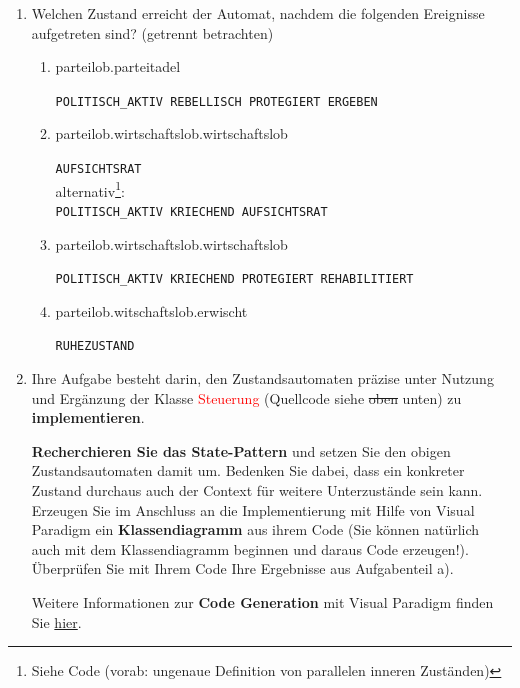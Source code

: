 \documentclass{article}
\begin{document}
    \begin{enumerate}[label=\alph*.]
        \item Welchen Zustand erreicht der Automat, nachdem die folgenden Ereignisse aufgetreten sind? (getrennt betrachten)
            \begin{enumerate}[label=\roman*.]
                \item parteilob.parteitadel

                    \texttt{POLITISCH\_AKTIV REBELLISCH PROTEGIERT ERGEBEN}
                
                \item parteilob.wirtschaftslob.wirtschaftslob

                    \texttt{AUFSICHTSRAT}\\
                    alternativ\footnote{Siehe Code (vorab: ungenaue Definition von parallelen inneren Zuständen)}:\\
                    \texttt{POLITISCH\_AKTIV KRIECHEND AUFSICHTSRAT}
                
                \item parteilob.wirtschaftslob.wirtschaftslob

                    \texttt{POLITISCH\_AKTIV KRIECHEND PROTEGIERT REHABILITIERT}
                
                \item parteilob.witschaftslob.erwischt

                    \texttt{RUHEZUSTAND}
            \end{enumerate}

        \newpage
        \item Ihre Aufgabe besteht darin, den Zustandsautomaten präzise unter Nutzung und Ergänzung der Klasse \textcolor{red}{Steuerung} (Quellcode siehe \sout{oben} unten) zu \textbf{implementieren}.

            \textbf{Recherchieren Sie das State-Pattern} und setzen Sie den obigen Zustandsautomaten damit um.
            Bedenken Sie dabei, dass ein konkreter Zustand durchaus auch der Context für weitere Unterzustände sein kann.
            Erzeugen Sie im Anschluss an die Implementierung mit Hilfe von Visual Paradigm ein \textbf{Klassendiagramm} aus ihrem Code (Sie können natürlich auch mit dem Klassendiagramm beginnen und daraus Code erzeugen!).
            Überprüfen Sie mit Ihrem Code Ihre Ergebnisse aus Aufgabenteil a).
            
            Weitere Informationen zur \textbf{Code Generation} mit Visual Paradigm finden Sie \href{https://www.visual-paradigm.com/support/documents/vpuserguide/276/381/7486_generateorup.html}{hier}.


\end{enumerate}
\end{document}
